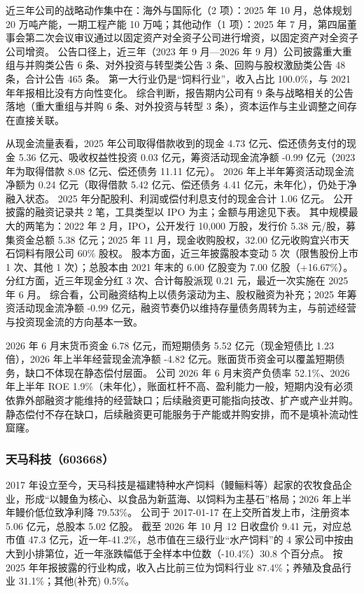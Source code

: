  近三年公司的战略动作集中在：海外与国际化（2 项）：2025 年 10 月，总体规划 20 万吨产能，一期工程产能 10 万吨；其他动作（1 项）：2025 年 7 月，第四届董事会第二次会议审议通过以固定资产对全资子公司进行增资，以固定资产对全资子公司增资。 公告口径上，近三年（2023 年 9 月---2026 年 9 月）公司披露重大重组与并购类公告 6 条、对外投资与转型类公告 3 条、回购与股权激励类公告 48 条，合计公告 465 条。 第一大行业仍是“饲料行业”，收入占比 100.0\%，与 2021 年年报相比没有方向性变化。 综合判断，报告期内公司有 9 条与战略相关的公告落地（重大重组与并购 6 条、对外投资与转型 3 条），资本运作与主业调整之间存在直接关联。

 从现金流量表看，2025 年公司取得借款收到的现金 4.73 亿元、偿还债务支付的现金 5.36 亿元、吸收权益性投资 0.03 亿元，筹资活动现金流净额 -0.99 亿元（2023 年为取得借款 8.08 亿元、偿还债务 11.11 亿元）。 2026 年上半年筹资活动现金流净额为 0.24 亿元（取得借款 5.42 亿元、偿还债务 4.41 亿元，未年化），仍处于净融入状态。 2025 年分配股利、利润或偿付利息支付的现金合计 1.06 亿元。 公开披露的融资记录共 2 笔，工具类型以 IPO 为主；金额与用途见下表。 其中规模最大的两笔为：2022 年 2 月，IPO，公开发行 10,000 万股，发行价 5.38 元/股，募集资金总额 5.38 亿元；2025 年 11 月，现金收购股权，32.00 亿元收购宜兴市天石饲料有限公司 60\% 股权。 股本方面，近三年披露股本变动 5 次（限售股份上市 1 次、其他 1 次）；总股本由 2021 年末的 6.00 亿股变为 7.00 亿股（+16.67\%）。 分红方面，近三年现金分红 3 次、合计每股派现 0.21 元，最近一次实施在 2025 年 6 月。 综合看，公司融资结构上以债务滚动为主、股权融资为补充；2025 年筹资活动现金流净额 -0.99 亿元，融资节奏仍以维持存量债务周转为主，与前述经营与投资现金流的方向基本一致。

 2026 年 6 月末货币资金 6.78 亿元，而短期债务 5.52 亿元（现金短债比 1.23 倍），2026 年上半年经营现金流净额 -4.82 亿元。账面货币资金可以覆盖短期债务，缺口不体现在静态偿付层面。 公司 2026 年 6 月末资产负债率 52.1\%、2026 年上半年 ROE 1.9\%（未年化），账面杠杆不高、盈利能力一般，短期内没有必须依靠外部融资才能维持的经营缺口；后续融资更可能指向技改、扩产或产业并购。 静态偿付不存在缺口，后续融资更可能服务于产能或并购安排，而不是填补流动性窟窿。




\subsubsection{天马科技（603668）}
\label{co:603668}

 2017 年设立至今，天马科技是福建特种水产饲料（鳗鲡料等）起家的农牧食品企业，形成“以鳗鱼为核心、以食品为新蓝海、以饲料为主基石”格局；2026 年上半年鳗价低位致净利降 79.53\%。 公司于 2017-01-17 在上交所首发上市，注册资本 5.06 亿元，总股本 5.02 亿股。 截至 2026 年 10 月 12 日收盘价 9.41 元，对应总市值 47.3 亿元，近一年-41.2\%，总市值在三级行业“水产饲料”的 4 家公司中按由大到小排第位，近一年涨跌幅低于全样本中位数（-10.4\%）30.8 个百分点。 按 2025 年年报披露的行业构成，收入占比前三位为饲料行业 87.4\%；养殖及食品行业 31.1\%；其他(补充) 0.5\%。

